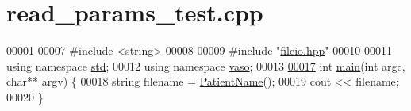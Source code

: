 \hypertarget{read__params__test_8cpp_source}{\section{read\+\_\+params\+\_\+test.\+cpp}
\label{read__params__test_8cpp_source}
}

\begin{DoxyCode}
00001 
00007 \textcolor{preprocessor}{#include <string>}
00008 
00009 \textcolor{preprocessor}{#include "\hyperlink{fileio_8hpp}{fileio.hpp}"}
00010 
00011 \textcolor{keyword}{using namespace }\hyperlink{namespacestd}{std};
00012 \textcolor{keyword}{using namespace }\hyperlink{namespacevaso}{vaso};
00013 
\hypertarget{read__params__test_8cpp_source_l00017}{}\hyperlink{read__params__test_8cpp_a3c04138a5bfe5d72780bb7e82a18e627}{00017} \textcolor{keywordtype}{int} \hyperlink{read__params__test_8cpp_a3c04138a5bfe5d72780bb7e82a18e627}{main}(\textcolor{keywordtype}{int} argc, \textcolor{keywordtype}{char}** argv) \{
00018     \textcolor{keywordtype}{string} filename = \hyperlink{namespacevaso_a21e264fa912f7ca3f50e7e412ba1582e}{PatientName}();
00019     cout << filename;
00020 \}
\end{DoxyCode}
